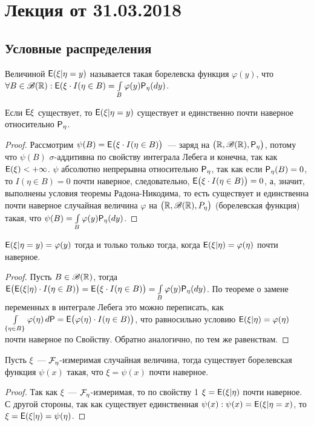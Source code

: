 \section{Лекция от 31.03.2018}
 \subsection*{Условные распределения}
 \begin{definition}
 	Величиной $\E (\xi | \eta = y)$ называется такая борелевска функция $\varphi(y)$, что $\forall B \in \B(\R): \E(\xi \cdot I(\eta \in B) = \int\limits_B \varphi(y) \P_\eta (d y)$.
 \end{definition}
 \begin{lemma}
 	Если $\E \xi$ существует, то $\E( \xi | \eta = y)$ существует и единственно почти наверное относительно $\P_\eta$.
 	\begin{proof}
 		Рассмотрим $\psi(B) = \E \big( \xi \cdot I (\eta \in B) \big)$~--- заряд на $\big( \R, \B(\R), \P_\eta \big)$, потому что $\psi(B)$ $\sigma$-аддитивна по свойству интеграла Лебега и конечна, так как $\E(\xi) < +\infty$. $\psi$ абсолютно непрерывна относительно $\P_\eta$, так как если $\P_\eta(B) = 0$, то $I(\eta \in B) = 0$ почти наверное, следовательно, $\E \big( \xi \cdot I (\eta \in B) \big) = 0$, а, значит, выполнены условия теоремы Радона-Никодима, то есть существует и единственна почти наверное случайная величина $\varphi$ на $\big( \R, \B(\R), P_\eta \big)$ (борелевская функция) такая, что $\psi(B) = \int\limits_B \varphi(y) \P_\eta(dy)$.
 	\end{proof}
 \end{lemma}
 \begin{lemma}
 	$\E ( \xi | \eta = y) = \varphi(y)$ тогда и только только тогда, когда $\E(\xi | \eta) = \varphi(\eta)$ почти наверное.
 	\begin{proof}
 		Пусть $B \in \B(\R)$, тогда $\E \big( \E(\xi | \eta) \cdot I (\eta \in B) \big) = \E \big( \xi \cdot I(\eta \in B) \big) = \int\limits_B \varphi(y) \P_\eta(d y)$. По теореме о замене переменных в интеграле Лебега это можно переписать, как $\int\limits_{\{\eta \in B \}} \varphi(\eta) \, d \P = \E \big( \varphi(\eta) \cdot I (\eta \in B) \big)$, что равносильно условию $\E(\xi | \eta) = \varphi(\eta)$ почти наверное по Свойству. Обратно аналогично, по тем же равенствам.
 	\end{proof}
 \end{lemma}
 \begin{consequence}
 	Пусть $\xi$~--- $\F_\eta$-измеримая случайная величина, тогда существует борелевская функция $\psi(x)$ такая, что $\xi = \psi(x)$ почти наверное. 
 	\begin{proof}
 		Так как $\xi$~--- $\F_\eta$-измеримая, то по свойству 1 $\xi = \E(\xi | \eta)$ почти наверное. С другой стороны, так как существует единственная $\psi(x) : \psi(x) = \E(\xi | \eta = x)$, то $\xi = \E(\xi | \eta) = \psi(\eta)$.
 	\end{proof}	
 \end{consequence}
